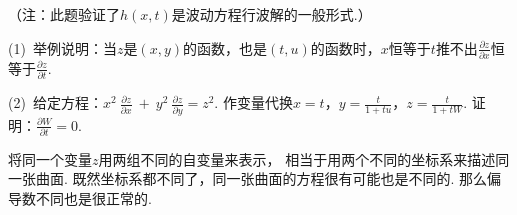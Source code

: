 （注：此题验证了$h(x,t)$是波动方程行波解的一般形式.）

\begin{example}[2023]
\label{ex:ch06-15}
(1)~举例说明：当$z$是$(x,y)$的函数，也是$(t,u)$的函数时，$x$恒等于$t$推不出$\frac{\partial z}{\partial x}$恒等于$\frac{\partial z}{\partial t}$.

(2)~给定方程：$x^2~ \frac{\partial z}{\partial x} ~+~ y^2~ \frac{\partial z}{\partial y} = z^2 $.
作变量代换$x = t$，$y = \frac{t}{1+tu}$，$z = \frac{t}{1+tW}$.
证明：$\frac{\partial W}{\partial t} = 0$.
\end{example}

\begin{analysis}
将同一个变量$z$用两组不同的自变量来表示，
相当于用两个不同的坐标系来描述同一张曲面.
既然坐标系都不同了，同一张曲面的方程很有可能也是不同的.
那么偏导数不同也是很正常的.
\end{analysis}

